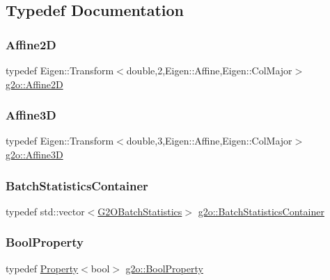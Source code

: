 \subsection{Typedef Documentation}
\mbox{\label{namespaceg2o_ad7410532a9e2e255e93781c6beb0feb8}} 
\subsubsection{\texorpdfstring{Affine2D}{Affine2D}}
{\footnotesize\ttfamily typedef Eigen\+::\+Transform$<$double,2,Eigen\+::\+Affine,Eigen\+::\+Col\+Major$>$ \mbox{\hyperlink{namespaceg2o_ad7410532a9e2e255e93781c6beb0feb8}{g2o\+::\+Affine2D}}}

\mbox{\label{namespaceg2o_ab3cae84956b78f00b9091c56c42af5eb}} 
\subsubsection{\texorpdfstring{Affine3D}{Affine3D}}
{\footnotesize\ttfamily typedef Eigen\+::\+Transform$<$double,3,Eigen\+::\+Affine,Eigen\+::\+Col\+Major$>$ \mbox{\hyperlink{namespaceg2o_ab3cae84956b78f00b9091c56c42af5eb}{g2o\+::\+Affine3D}}}

\mbox{\label{namespaceg2o_a526b32fde21f83173acb2bb29db68275}} 
\subsubsection{\texorpdfstring{Batch\+Statistics\+Container}{BatchStatisticsContainer}}
{\footnotesize\ttfamily typedef std\+::vector$<$\mbox{\hyperlink{structg2o_1_1_g2_o_batch_statistics}{G2\+O\+Batch\+Statistics}}$>$ \mbox{\hyperlink{namespaceg2o_a526b32fde21f83173acb2bb29db68275}{g2o\+::\+Batch\+Statistics\+Container}}}

\mbox{\label{namespaceg2o_a28e624fedcafeb2b049be2930421071f}} 
\subsubsection{\texorpdfstring{Bool\+Property}{BoolProperty}}
{\footnotesize\ttfamily typedef \mbox{\hyperlink{classg2o_1_1_property}{Property}}$<$bool$>$ \mbox{\hyperlink{namespaceg2o_a28e624fedcafeb2b049be2930421071f}{g2o\+::\+Bool\+Property}}}

